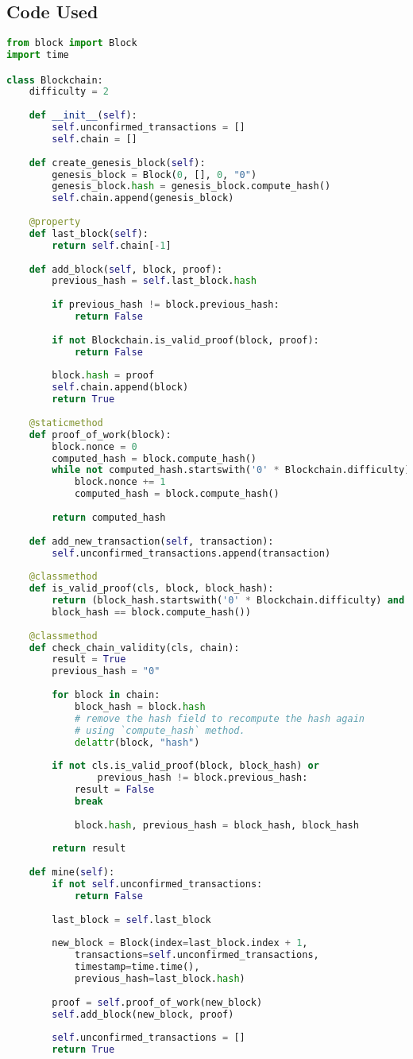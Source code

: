 \documentclass{article}
\begin{document}
\subsection{Code Used}
\begin{lstlisting}[language=Python]
from block import Block
import time

class Blockchain:
	difficulty = 2
	
	def __init__(self):
		self.unconfirmed_transactions = []
		self.chain = []
	
	def create_genesis_block(self):
		genesis_block = Block(0, [], 0, "0")
		genesis_block.hash = genesis_block.compute_hash()
		self.chain.append(genesis_block)
	
	@property
	def last_block(self):
		return self.chain[-1]
	
	def add_block(self, block, proof):
		previous_hash = self.last_block.hash
		
		if previous_hash != block.previous_hash:
			return False
		
		if not Blockchain.is_valid_proof(block, proof):
			return False
		
		block.hash = proof
		self.chain.append(block)
		return True
	
	@staticmethod
	def proof_of_work(block):
		block.nonce = 0
		computed_hash = block.compute_hash()
		while not computed_hash.startswith('0' * Blockchain.difficulty):
			block.nonce += 1
			computed_hash = block.compute_hash()
		
		return computed_hash
	
	def add_new_transaction(self, transaction):
		self.unconfirmed_transactions.append(transaction)
	
	@classmethod
	def is_valid_proof(cls, block, block_hash):
		return (block_hash.startswith('0' * Blockchain.difficulty) and
		block_hash == block.compute_hash())
	
	@classmethod
	def check_chain_validity(cls, chain):
		result = True
		previous_hash = "0"
	
		for block in chain:
			block_hash = block.hash
			# remove the hash field to recompute the hash again
			# using `compute_hash` method.
			delattr(block, "hash")
		
		if not cls.is_valid_proof(block, block_hash) or 
				previous_hash != block.previous_hash:	
			result = False
			break
		
			block.hash, previous_hash = block_hash, block_hash
		
		return result
	
	def mine(self):
		if not self.unconfirmed_transactions:
			return False
		
		last_block = self.last_block
		
		new_block = Block(index=last_block.index + 1,
			transactions=self.unconfirmed_transactions,
			timestamp=time.time(),
			previous_hash=last_block.hash)
		
		proof = self.proof_of_work(new_block)
		self.add_block(new_block, proof)
		
		self.unconfirmed_transactions = []
		return True
\end{lstlisting}
	
\end{document}
